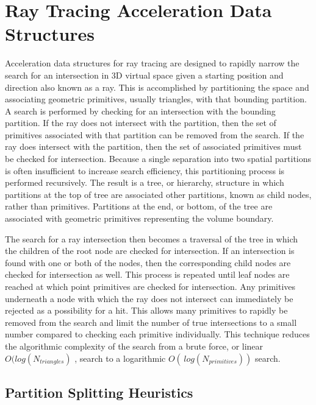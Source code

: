 \section{Ray Tracing Acceleration Data Structures}

Acceleration data structures for ray tracing are designed to rapidly narrow the
search for an intersection in 3D virtual space given a starting position and
direction also known as a ray. This is accomplished by partitioning the space
and associating geometric primitives, usually triangles, with that bounding
partition. A search is performed by checking for an intersection with the
bounding partition. If the ray does not intersect with the partition, then the
set of primitives associated with that partition can be removed from the
search. If the ray does intersect with the partition, then the set of associated
primitives must be checked for intersection. Because a single separation into
two spatial partitions is often insufficient to increase search efficiency, this
partitioning process is performed recursively. The result is a tree, or
hierarchy, structure in which partitions at the top of tree are associated other
partitions, known as child nodes, rather than primitives. Partitions at the end,
or bottom, of the tree are associated with geometric primitives representing the
volume boundary.

The search for a ray intersection then becomes a traversal of the tree in which
the children of the root node are checked for intersection. If an intersection
is found with one or both of the nodes, then the corresponding child nodes are
checked for intersection as well. This process is repeated until leaf nodes are
reached at which point primitives are checked for intersection. Any primitives
underneath a node with which the ray does not intersect can immediately be
rejected as a possibility for a hit. This allows many primitives to rapidly be
removed from the search and limit the number of true intersections to a small
number compared to checking each primitive individually. This technique reduces
the algorithmic complexity of the search from a brute force, or linear
$O(log(N_{triangles})$ , search to a logarithmic $O(\, log(N_{primitives}))$
search.

\subsection{Partition Splitting Heuristics}

